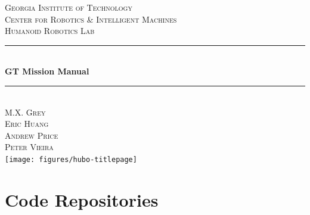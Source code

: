 \documentclass[letterpaper, 10 pt]{report}
\begin{document}
\begin{titlepage}
\center
\textsc{\LARGE Georgia Institute of Technology}\\[1.5cm]
\textsc{\large Center for Robotics \& Intelligent Machines}\\[0.5cm]
\textsc{\large Humanoid Robotics Lab}\\[0.5cm]
\rule{\linewidth}{0.5mm}\\[0.4cm]
{\huge \bfseries GT Mission Manual}\\[0.4cm]
\rule{\linewidth}{0.5mm}\\[1.5cm]
\textsc{\normalsize M.X. Grey}\\
\textsc{\normalsize Eric Huang}\\
\textsc{\normalsize Andrew Price}\\
\textsc{\normalsize Peter Vieira}\\[1.5cm]
\texttt{[image: figures/hubo-titlepage]}
\vfill
\end{titlepage}


\tableofcontents
\newpage


%
\section{Code Repositories}\label{sec:code-repos}
\end{document}
